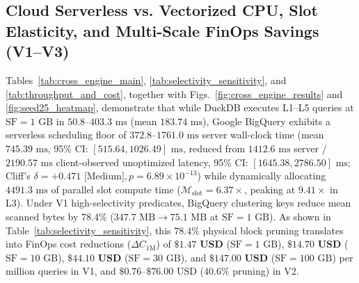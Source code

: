 \documentclass[10pt,a4paper]{article}
\begin{document}
\subsection{Cloud Serverless vs. Vectorized CPU, Slot Elasticity, and Multi-Scale FinOps Savings (V1--V3)}
Tables~\ref{tab:cross_engine_main}, \ref{tab:selectivity_sensitivity}, and \ref{tab:throughput_and_cost}, together with Figs.~\ref{fig:cross_engine_results} and \ref{fig:seed25_heatmap}, demonstrate that while DuckDB executes L1--L5 queries at $\text{SF}=1\text{ GB}$ in $50.8\text{--}403.3\text{ ms}$ (mean $183.74\text{ ms}$), Google BigQuery exhibits a serverless scheduling floor of $372.8\text{--}1761.0\text{ ms}$ server wall-clock time (mean $745.39\text{ ms}$, 95\% CI: $[515.64, 1026.49]\text{ ms}$, reduced from $1412.6\text{ ms}$ server / $2190.57\text{ ms}$ client-observed unoptimized latency, 95\% CI: $[1645.38, 2786.50]\text{ ms}$; Cliff's $\delta = +0.471\text{ [Medium]}, p = 6.89 \times 10^{-13}$) while dynamically allocating $4491.3\text{ ms}$ of parallel slot compute time ($\mathcal{M}_{\text{slot}} = 6.37\times$, peaking at $9.41\times$ in L3). Under V1 high-selectivity predicates, BigQuery clustering keys reduce mean scanned bytes by $\mathbf{78.4\%}$ ($347.7\text{ MB} \rightarrow 75.1\text{ MB}$ at $\text{SF}=1\text{ GB}$). As shown in Table~\ref{tab:selectivity_sensitivity}, this $78.4\%$ physical block pruning translates into FinOps cost reductions ($\Delta C_{\text{1M}}$) of $\mathbf{\$1.47\text{ USD}}$ ($\text{SF}=1\text{ GB}$), $\mathbf{\$14.70\text{ USD}}$ ($\text{SF}=10\text{ GB}$), $\mathbf{\$44.10\text{ USD}}$ ($\text{SF}=30\text{ GB}$), and $\mathbf{\$147.00\text{ USD}}$ ($\text{SF}=100\text{ GB}$) per million queries in V1, and $\$0.76\text{--}\$76.00\text{ USD}$ ($40.6\%$ pruning) in V2.
\end{document}
